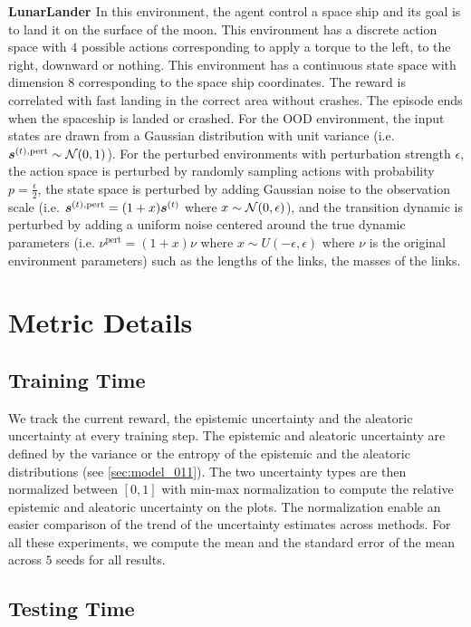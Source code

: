 \textbf{LunarLander \citep{lunarlander1}} In this environment, the agent control a space ship and its goal is to land it on the surface of the moon. This environment has a discrete action space with $4$ possible actions corresponding to apply a torque to the left, to the right, downward or nothing. This environment has a continuous state space with dimension $8$ corresponding to the space ship coordinates. The reward is correlated with fast landing in the correct area without crashes. The episode ends when the spaceship is landed or crashed. For the OOD environment, the input states are drawn from a Gaussian distribution with unit variance (i.e. $\bm{s}^{(t), \text{pert}} \sim \operatorname{\mathcal{N}}(0, 1)$). For the perturbed environments with perturbation strength $\epsilon$, the action space is perturbed by randomly sampling actions with probability $p=\frac{\epsilon}{2}$, the state space is perturbed by adding Gaussian noise to the observation scale (i.e. $\bm{s}^{(t), \text{pert}} = (1 + x)\bm{s}^{(t)}$ where $x \sim \operatorname{\mathcal{N}}(0, \epsilon)$), and the transition dynamic is perturbed by adding a uniform noise centered around the true dynamic parameters (i.e. $\nu^{\text{pert}} = (1 + x) \nu$ where $x \sim U(-\epsilon, \epsilon)$ where $\nu$ is the original environment parameters) such as the lengths of the links, the masses of the links.

\section{Metric Details}
\subsection{Training Time}
\label{app:training-time-metric-details}

We track the current reward, the epistemic uncertainty and the aleatoric uncertainty at every training step. The epistemic and aleatoric uncertainty are defined by the variance or the entropy of the epistemic and the aleatoric distributions (see \cref{sec:model_011}).  The two uncertainty types are then normalized between $[0, 1]$ with min-max normalization to compute the relative epistemic and aleatoric uncertainty on the plots. The normalization enable an easier comparison of the trend of the uncertainty estimates across methods. For all these experiments, we compute the mean and the standard error of the mean across $5$ seeds for all results.

\subsection{Testing Time}
\label{app:testing-time-metric-details}

